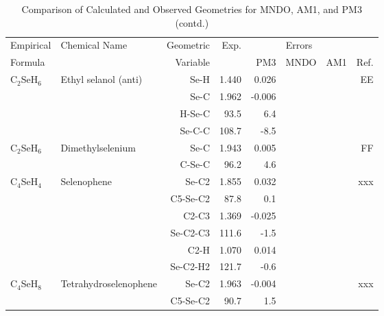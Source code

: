 \begin{table}
\caption{\label{geotabw}Comparison of Calculated and Observed Geometries for 
MNDO, AM1, and PM3 (contd.)}
\begin{center}
\compresstable
\begin{tabular}{llrrrrrr}
 Empirical  & Chemical Name &  Geometric &  Exp. & \multicolumn{3}{c}{Errors} & \\
  Formula   &               &  Variable &        & PM3  & MNDO  &  AM1 & Ref.\\
\hline
 C$_2$SeH$_6$      & Ethyl selanol (anti)               &Se-H           &     1.440   &     0.026 &  &  &    EE \\
             &                                    &Se-C           &     1.962   &    -0.006 &  &  &       \\
             &                                    &H-Se-C       &      93.5   &       6.4 &  &    &       \\
             &                                    &Se-C-C       &     108.7   &      -8.5 &  &    &       \\
 C$_2$SeH$_6$      & Dimethylselenium                   &Se-C           &     1.943   &     0.005 &  &  &    FF \\
             &                                    &C-Se-C       &      96.2   &       4.6 &  &    &       \\
 C$_4$SeH$_4$      & Selenophene                        &Se-C2          &     1.855   &     0.032 &  &  &   xxx \\
             &                                    &C5-Se-C2     &      87.8   &       0.1 &  &    &       \\
             &                                    &C2-C3          &     1.369   &    -0.025 &  &  &       \\
             &                                    &Se-C2-C3     &     111.6   &      -1.5 &  &    &       \\
             &                                    &C2-H           &     1.070   &     0.014 &  &  &       \\
             &                                    &Se-C2-H2     &     121.7   &      -0.6 &  &    &       \\
 C$_4$SeH$_8$      & Tetrahydroselenophene              &Se-C2          &     1.963   &    -0.004 &  &  &   xxx \\
             &                                    &C5-Se-C2     &      90.7   &       1.5 &  &    &       \\

\end{tabular}
\end{center}
\end{table}
